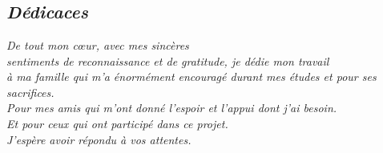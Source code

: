 \chapter*{}
\section*{\centering \textit{Dédicaces}}
\begin{center}
\vspace{6mm}
\textit{De tout mon cœur, avec mes sincères \\sentiments de reconnaissance et de gratitude, je dédie mon travail\\ à ma famille qui m’a énormément encouragé durant mes études et pour ses sacrifices. \\Pour mes amis qui m’ont donné l’espoir et l'appui dont j’ai besoin.\\ Et pour ceux qui ont participé dans ce projet.\\
J’espère avoir répondu à vos attentes. }



\end{center}